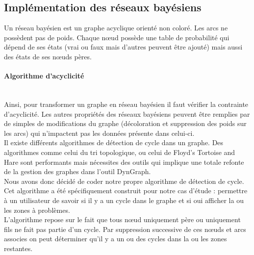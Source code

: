 \documentclass[conference]{IEEEtran}
\begin{document}
\subsection{Implémentation des réseaux bayésiens}

Un réseau bayésien est un graphe acyclique orienté non coloré. Les arcs ne possèdent pas de poids. Chaque nœud possède une table de probabilité qui dépend de ses états (vrai ou faux mais d'autres peuvent être ajouté) mais aussi des états de ses nœuds pères. \\
\paragraph{Algorithme d'acyclicité \hfill } 
\\
Ainsi, pour transformer un graphe en réseau bayésien il faut vérifier la contrainte d'acyclicité. Les autres propriétés des réseaux bayésiens peuvent être remplies par de simples de modifications du graphe (décoloration et suppression des poids sur les arcs) qui n'impactent pas les données présente dans celui-ci. \\
Il existe différents algorithmes de détection de cycle dans un graphe. Des algorithmes comme celui du tri topologique, ou celui de Floyd's Tortoise and Hare sont performants mais nécessites des outils qui implique une totale refonte de la gestion des graphes dans l'outil DynGraph. \\
Nous avons donc décidé de coder notre propre algorithme de détection de cycle. Cet algorithme a été spécifiquement construit pour notre cas d'étude : permettre à un utilisateur de savoir si il y a un cycle dans le graphe et si oui afficher la ou les zones à problèmes. \\
L'algorithme repose sur le fait que tous nœud uniquement père ou uniquement fils ne fait pas partie d'un cycle. Par suppression successive de ces nœuds et arcs associes on peut déterminer qu'il y a un ou des cycles dans la ou les zones restantes.  \\
\end{document}
